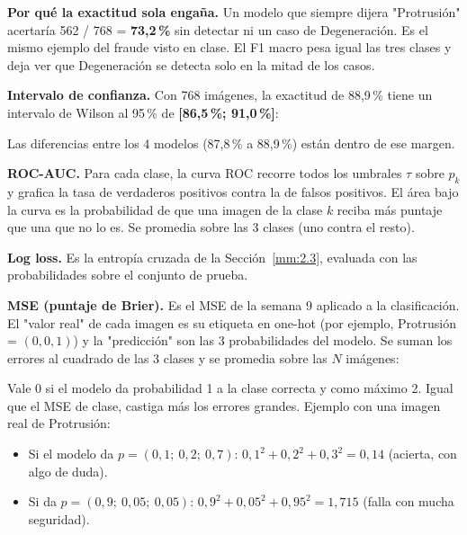 \textbf{Por qué la exactitud sola engaña.} Un modelo que siempre dijera "Protrusión" acertaría 562 / 768 = \textbf{73,2\,\%} sin detectar ni un caso de Degeneración. Es el mismo ejemplo del fraude visto en clase. El F1 macro pesa igual las tres clases y deja ver que Degeneración se detecta solo en la mitad de los casos.

\textbf{Intervalo de confianza.} Con 768 imágenes, la exactitud de 88,9\,\% tiene un intervalo de Wilson al 95\,\% de \textbf{[86,5\,\%; 91,0\,\%]}:

\begin{center}
\end{center}

Las diferencias entre los 4 modelos (87,8\,\% a 88,9\,\%) están dentro de ese margen.

\textbf{ROC-AUC.} Para cada clase, la curva ROC recorre todos los umbrales $\tau$ sobre $p_k$ y grafica la tasa de verdaderos positivos contra la de falsos positivos. El área bajo la curva es la probabilidad de que una imagen de la clase $k$ reciba más puntaje que una que no lo es. Se promedia sobre las 3 clases (uno contra el resto).

\textbf{Log loss.} Es la entropía cruzada de la Sección~\ref{mm:2.3}, evaluada con las probabilidades sobre el conjunto de prueba.

\textbf{MSE (puntaje de Brier).} Es el MSE de la semana 9 aplicado a la clasificación. El "valor real" de cada imagen es su etiqueta en one-hot (por ejemplo, Protrusión = $(0, 0, 1)$) y la "predicción" son las 3 probabilidades del modelo. Se suman los errores al cuadrado de las 3 clases y se promedia sobre las $N$ imágenes:

\begin{center}
\end{center}

Vale 0 si el modelo da probabilidad 1 a la clase correcta y como máximo 2. Igual que el MSE de clase, castiga más los errores grandes. Ejemplo con una imagen real de Protrusión:
\begin{itemize}
  \item Si el modelo da $p = (0{,}1;\ 0{,}2;\ 0{,}7)$: $0{,}1^2 + 0{,}2^2 + 0{,}3^2 = 0{,}14$ (acierta, con algo de duda).
  \item Si da $p = (0{,}9;\ 0{,}05;\ 0{,}05)$: $0{,}9^2 + 0{,}05^2 + 0{,}95^2 = 1{,}715$ (falla con mucha seguridad).
\end{itemize}

